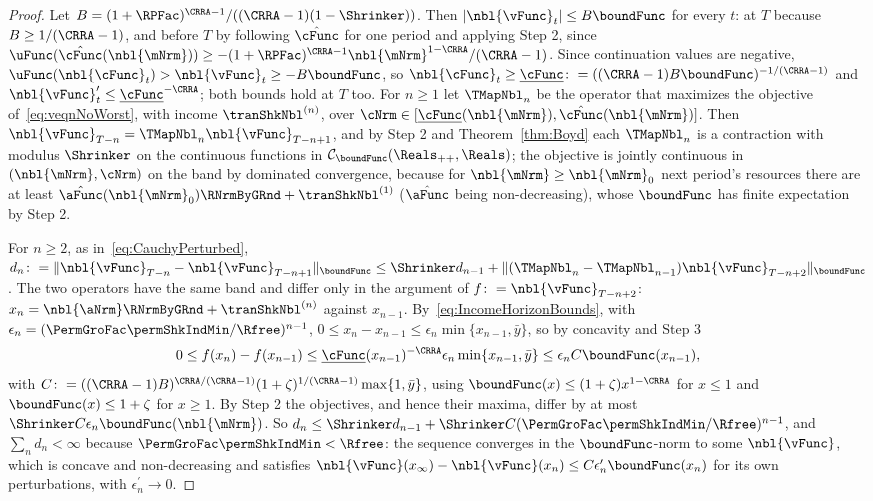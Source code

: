 \documentclass[\econtexRoot/BufferStockTheory]{subfiles}
\begin{document}
\begin{proof}
Let $B=(1+\RPFac)^{\CRRA-1}/((\CRRA-1)(1-\Shrinker))$.
Then $\vert\nbl{\vFunc}_{t}\vert\leq B\boundFunc$ for every $t$: at $T$ because $B\geq 1/(\CRRA-1)$, and before $T$ by following $\hat{\cFunc}$ for one period and applying Step 2, since $\uFunc(\hat{\cFunc}(\nbl{\mNrm}))\geq-(1+\RPFac)^{\CRRA-1}\nbl{\mNrm}^{1-\CRRA}/(\CRRA-1)$.
Since continuation values are negative, $\uFunc(\nbl{\cFunc}_{t})>\nbl{\vFunc}_{t}\geq-B\boundFunc$, so $\nbl{\cFunc}_{t}\geq\underline{\cFunc}\colon=((\CRRA-1)B\boundFunc)^{-1/(\CRRA-1)}$ and $\nbl{\vFunc}_{t}^{\prime}\leq\underline{\cFunc}^{-\CRRA}$; both bounds hold at $T$ too.
For $n\geq 1$ let $\TMapNbl_{n}$ be the operator that maximizes the objective of~\eqref{eq:veqnNoWorst}, with income $\tranShkNbl^{(n)}$, over $\cNrm\in[\underline{\cFunc}(\nbl{\mNrm}),\hat{\cFunc}(\nbl{\mNrm})]$.
Then $\nbl{\vFunc}_{T-n}=\TMapNbl_{n}\nbl{\vFunc}_{T-n+1}$, and by Step 2 and Theorem~\ref{thm:Boyd} each $\TMapNbl_{n}$ is a contraction with modulus $\Shrinker$ on the continuous functions in $\mathcal{C}_{\boundFunc}(\Reals_{++},\Reals)$; the objective is jointly continuous in $(\nbl{\mNrm},\cNrm)$ on the band by dominated convergence, because for $\nbl{\mNrm}\geq\nbl{\mNrm}_{0}$ next period's resources there are at least $\hat{\aFunc}(\nbl{\mNrm}_{0})\RNrmByGRnd+\tranShkNbl^{(1)}$ ($\hat{\aFunc}$ being non-decreasing), whose $\boundFunc$ has finite expectation by Step 2.

For $n\geq 2$, as in~\eqref{eq:CauchyPerturbed}, $d_{n}\colon=\Vert\nbl{\vFunc}_{T-n}-\nbl{\vFunc}_{T-n+1}\Vert_{\boundFunc}\leq\Shrinker d_{n-1}+\Vert(\TMapNbl_{n}-\TMapNbl_{n-1})\nbl{\vFunc}_{T-n+2}\Vert_{\boundFunc}$.
The two operators have the same band and differ only in the argument of $f\colon=\nbl{\vFunc}_{T-n+2}$: $x_{n}=\nbl{\aNrm}\RNrmByGRnd+\tranShkNbl^{(n)}$ against $x_{n-1}$.
By~\eqref{eq:IncomeHorizonBounds}, with $\epsilon_{n}=(\PermGroFac\permShkIndMin/\Rfree)^{n-1}$, $0\leq x_{n}-x_{n-1}\leq\epsilon_{n}\min\{x_{n-1},\bar{y}\}$, so by concavity and Step 3
\begin{equation*}
  0\leq f(x_{n})-f(x_{n-1})\leq\underline{\cFunc}(x_{n-1})^{-\CRRA}\epsilon_{n}\min\{x_{n-1},\bar{y}\}\leq\epsilon_{n}C\boundFunc(x_{n-1}),
\end{equation*}
with $C\colon=((\CRRA-1)B)^{\CRRA/(\CRRA-1)}(1+\zeta)^{1/(\CRRA-1)}\max\{1,\bar{y}\}$, using $\boundFunc(x)\leq(1+\zeta)x^{1-\CRRA}$ for $x\leq 1$ and $\boundFunc(x)\leq 1+\zeta$ for $x\geq 1$.
By Step 2 the objectives, and hence their maxima, differ by at most $\Shrinker C\epsilon_{n}\boundFunc(\nbl{\mNrm})$.
So $d_{n}\leq\Shrinker d_{n-1}+\Shrinker C(\PermGroFac\permShkIndMin/\Rfree)^{n-1}$, and $\sum_{n}d_{n}<\infty$ because $\PermGroFac\permShkIndMin<\Rfree$: the sequence converges in the $\boundFunc$-norm to some $\nbl{\vFunc}$, which is concave and non-decreasing and satisfies $\nbl{\vFunc}(x_{\infty})-\nbl{\vFunc}(x_{n})\leq C\epsilon_{n}^{\prime}\boundFunc(x_{n})$ for its own perturbations, with $\epsilon_{n}^{\prime}\rightarrow 0$.


\end{proof}
\end{document}
